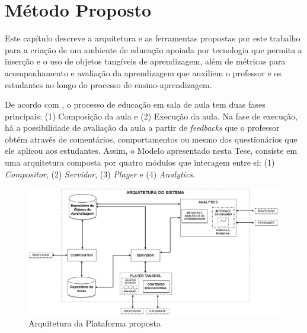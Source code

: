 
\chapter{Método Proposto} \label{Chap:prosedMethod}

Este capítulo descreve a arquitetura e as ferramentas propostas por este trabalho para a criação de um ambiente de educação apoiada por tecnologia que permita a inserção e o uso de objetos tangíveis de aprendizagem, além de métricas para acompanhamento e avaliação da aprendizagem que auxiliem o professor e os estudantes ao longo do processo de ensino-aprendizagem.

De acordo com \cite{Zilse:2016}, o processo de educação em sala de aula tem duas fases principais: (1) Composição da aula e (2) Execução da aula. Na fase de execução, há a possibilidade de avaliação da aula a partir de \textit{feedbacks} que o professor obtém através de comentários, comportamentos ou mesmo dos questionários que ele aplicou aos estudantes. Assim, o Modelo apresentado nesta Tese, consiste em uma arquitetura composta por quatro módulos que interagem entre si: (1) \textit{Compositor}, (2) \textit{Servidor}, (3)  \textit{Player} e (4) \textit{Analytics}.

\begin{figure}[htb]
\centering
\includegraphics[width=1\linewidth]{chapters/proposedMethod/arquitetura_v4_1.png}
\caption{Arquitetura da Plataforma proposta}
\label{fig:arquitetura}
\end{figure}

